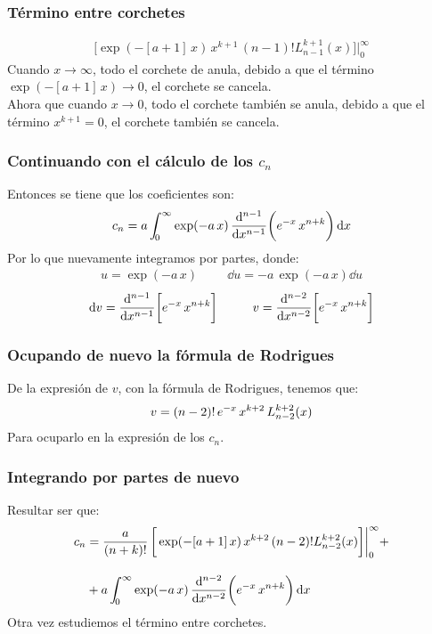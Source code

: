 \documentclass[12pt]{beamer}
\begin{document}
\begin{frame}
\frametitle{Término entre corchetes}
\begin{align*}
\bigg[ \exp(-[a + 1] \, x) \, x^{k+1} \, (n - 1)! L_{n-1}^{k+1}(x) \bigg] \bigg\vert_{0}^{\infty}
\end{align*}
\pause
Cuando $x \to \infty$, todo el corchete de anula, debido a que el término $\exp(-[a + 1] \, x) \to 0$, \pause el corchete se cancela.
\\
\bigskip
\pause
Ahora que cuando $x \to 0$, todo el corchete también se anula, debido a que el término $x^{k+1} = 0$, el corchete también se cancela.
\end{frame}
\begin{frame}
\frametitle{Continuando con el cálculo de los $c_{n}$}
Entonces se tiene que los coeficientes son:
\begin{align*}
c_{n} = a \, \scaleint{5ex}_{\bs 0}^{\infty} \exp( - a \, x) \, \dv[n-1]{x} \bigg( e^{-x} \, x^{n+k} \bigg) \dd{x}
\end{align*}
\pause
Por lo que nuevamente integramos por partes,
donde:
\pause
\begin{align*}
u = \exp(-a \, x) \hspace{1cm} \dd{u} = - a \, \exp(-a \, x) \dd{u} 
\end{align*}
\pause
\begin{align*}
\dd{v} = \dv[n-1]{x} \bigg[ e^{-x} \, x^{n+k} \bigg] \hspace{1cm} v = \dv[n-2]{x} \bigg[ e^{-x} \, x^{n+k} \bigg]
\end{align*}
\end{frame}
\begin{frame}
\frametitle{Ocupando de nuevo la fórmula de Rodrigues}
De la expresión de $v$, con la fórmula de Rodrigues, tenemos que:
\begin{align*}
v = (n - 2)! \, e^{-x} \, x^{k+2} \, \scaleto{L_{n-2}^{k+2}(x)}{3ex}
\end{align*}
\pause
Para ocuparlo en la expresión de los $c_{n}$.
\end{frame}
\begin{frame}
\frametitle{Integrando por partes de nuevo}
Resultar ser que:
\begin{align*}
c_{n} &= \dfrac{a}{(n+ k)!} \, \bigg[ \exp(-[a + 1] \, x) \, x^{k+2} \, (n - 2)! L_{n-2}^{k+2}(x) \bigg] \bigg\vert_{0}^{\infty} + \\[1em]
&+ a \, \scaleint{5ex}_{\bs 0}^{\infty} \exp( - a \, x) \, \dv[n-2]{x} \bigg( e^{-x} \, x^{n+k} \bigg) \dd{x}
\end{align*}
\pause
Otra vez estudiemos el término entre corchetes.
\end{frame}
\end{document}
